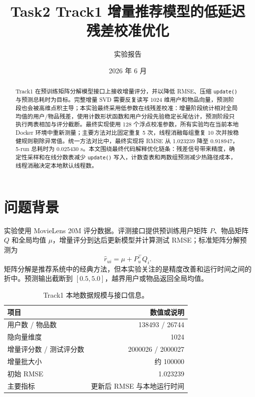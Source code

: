 \documentclass[UTF8,zihao=-4,scheme=plain]{ctexart}
\title{\vspace{-1.3em}Task2 Track1 增量推荐模型的低延迟残差校准优化}
\author{实验报告}
\date{\vspace{-0.9em}2026 年 6 月}
\begin{document}
\maketitle
\vspace{-1.35em}

\begin{abstract}
Track1 在预训练矩阵分解模型接口上接收增量评分，并以降低 RMSE、压缩 \texttt{update()} 与预测总耗时为目标。完整增量 SVD 需要反复读写 1024 维用户和物品向量，预测阶段也会被高维点积主导；本实验最终采用低参数在线残差校准：增量阶段统计相对全局均值的用户/物品残差，使用计数形状函数和用户分段先验稳定长尾估计，预测阶段只执行两表相加与评分截断。最终实现使用 128 个浮点校准参数，所有实验均在当前本地 Docker 环境中重新测量；主要方法对比固定重复 5 次，线程消融每组重复 10 次并按稳健规则剔除异常值。统一方法对比中，最终实现将 RMSE 从 1.023239 降至 0.918947，5-run 总耗时为 0.025430 s。本文围绕最终代码解释优化链条：残差信号带来精度，确定性采样和在线分数表减少 \texttt{update()} 写入，计数查表和两数组预测减少热路径成本，线程消融决定本地默认线程数。
\end{abstract}

\section{问题背景}

实验使用 MovieLens 20M 评分数据\cite{harper2015movielens}。评测接口提供预训练用户矩阵 $P$、物品矩阵 $Q$ 和全局均值 $\mu$，增量评分到达后更新模型并计算测试 RMSE；标准矩阵分解预测为
\begin{equation}
\hat r_{ui}=\mu+P_u^\top Q_i .
\label{eq:svd}
\end{equation}
矩阵分解是推荐系统中的经典方法\cite{koren2009matrix}，但本实验关注的是精度改善和运行时间之间的折中。预测输出截断到 $[0.5,5.0]$，越界用户或物品返回全局均值。

\begin{table}[H]
  \centering
  \caption{Track1 本地数据规模与接口信息。}
  \label{tab:data}
  \small
  \begin{tabular}{lr}
    \toprule
    项目 & 数值或说明\\
    \midrule
    用户数 / 物品数 & 138493 / 26744\\
    隐向量维度 & 1024\\
    增量评分数 / 测试评分数 & 2000026 / 2000027\\
    增量批大小 & 约 100000\\
    初始 RMSE & 1.023239\\
    主要指标 & 更新后 RMSE 与本地运行时间\\
    \bottomrule
  \end{tabular}
\end{table}
\end{document}
